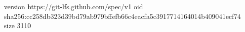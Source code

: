version https://git-lfs.github.com/spec/v1
oid sha256:cc258db323d39bd79ab979bffefb66c4eacfa5c3917714164014b409041ecf74
size 3110
